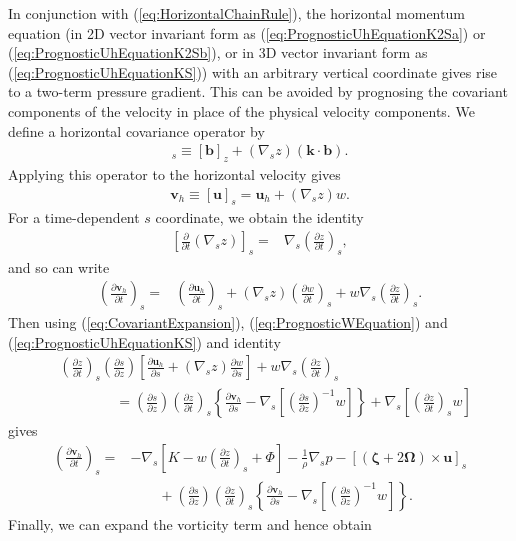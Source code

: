 \documentclass[gmd, manuscript]{copernicus}
\newcommand{\vb}{\mathbf}
\newcommand{\vg}{\boldsymbol}
\newcommand{\pdiff}[2]{\frac{\partial #1}{\partial #2}}
\begin{document}
In conjunction with (\ref{eq:HorizontalChainRule}), the horizontal momentum equation (in 2D vector invariant form as  (\ref{eq:PrognosticUhEquationK2Sa}) or (\ref{eq:PrognosticUhEquationK2Sb}), or in 3D vector invariant form as (\ref{eq:PrognosticUhEquationKS})) with an arbitrary vertical coordinate gives rise to a two-term pressure gradient.  This can be avoided by prognosing the covariant components of the velocity in place of the physical velocity components.  We define a horizontal covariance operator by
\begin{align}
[\vb{b}]_s \equiv [\vb{b}]_z + (\nabla_s z) (\vb{k} \cdot \vb{b}).
\end{align} Applying this operator to the horizontal velocity gives
\begin{align}
\vb{v}_h \equiv [\vb{u}]_s = \vb{u}_h + (\nabla_s z) w.
\end{align}  For a time-dependent $s$ coordinate, we obtain the identity
\begin{align}
\left[ \pdiff{}{t} (\nabla_s z) \right]_s =& \nabla_s \left( \pdiff{z}{t} \right)_s,
\end{align} and so can write
\begin{align} \label{eq:CovariantExpansion}
\left( \pdiff{\vb{v}_h}{t} \right)_s =& \left( \pdiff{\vb{u}_h}{t} \right)_s + (\nabla_s z) \left( \pdiff{w}{t} \right)_s + w \nabla_s \left( \pdiff{z}{t} \right)_s.
\end{align}  Then using (\ref{eq:CovariantExpansion}), (\ref{eq:PrognosticWEquation}) and (\ref{eq:PrognosticUhEquationKS}) and identity
\begin{align}
& \left( \pdiff{z}{t} \right)_s \left( \pdiff{s}{z} \right) \left[ \pdiff{\vb{u}_h}{s} + (\nabla_s z) \pdiff{w}{s} \right] + w \nabla_s \left( \pdiff{z}{t} \right)_s \nonumber \\
& \qquad \qquad  = \left( \pdiff{s}{z} \right) \left( \pdiff{z}{t} \right)_s \left\{ \pdiff{\vb{v}_h}{s} - \nabla_s \left[ \left( \pdiff{s}{z} \right)^{-1} w \right] \right\} + \nabla_s \left[ \left( \pdiff{z}{t} \right)_s w \right]
\end{align} gives
\begin{align}
\left( \pdiff{\vb{v}_h}{t} \right)_s =& - \nabla_s \left[ K - w \left( \pdiff{z}{t} \right)_s + \Phi \right] - \frac{1}{\rho} \nabla_s p - \left[ (\vg{\zeta} + 2 \vg{\Omega}) \times \vb{u} \right]_s \\
& \qquad + \left( \pdiff{s}{z} \right) \left( \pdiff{z}{t} \right)_s \left\{ \pdiff{\vb{v}_h}{s} - \nabla_s \left[ \left( \pdiff{s}{z} \right)^{-1} w \right] \right\}.
\end{align}  Finally, we can expand the vorticity term and hence obtain
\end{document}
